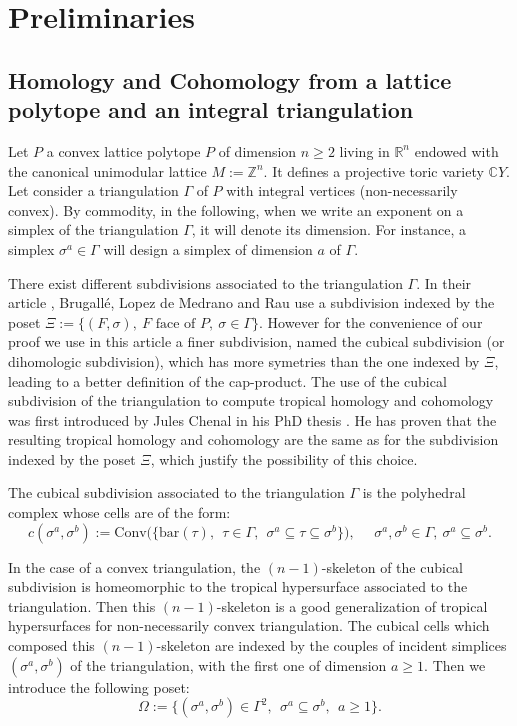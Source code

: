 \documentclass{article}
\begin{document}
\section{Preliminaries}

\subsection{Homology and Cohomology from a lattice polytope and an integral triangulation}

Let $P$ a convex lattice polytope $P$ of dimension $n \geq 2$ living in $\mathbb{R}^n$ endowed with the canonical unimodular lattice $M:= \mathbb{Z}^n$. It defines a projective toric variety $\mathbb{C}Y$. Let consider a triangulation $\Gamma$ of $P$ with integral vertices (non-necessarily convex). By commodity, in the following, when we write an exponent on a simplex of the triangulation $\Gamma$, it will denote its dimension. For instance, a simplex $\sigma^a \in \Gamma$ will design a simplex of dimension $a$ of $\Gamma$.

There exist different subdivisions associated to the triangulation $\Gamma$. In their article \cite{BMR 2024}, Brugallé, Lopez de Medrano and Rau use a subdivision indexed by the poset $\Xi:=\{(F,\sigma),~F \text{ face of}$ $P,~\sigma \in \Gamma \}$. However for the convenience of our proof we use in this article a finer subdivision, named the cubical subdivision (or dihomologic subdivision), which has more symetries than the one indexed by $\Xi$, leading to a better definition of the cap-product. The use of the cubical subdivision of the triangulation to compute tropical homology and cohomology was first introduced by Jules Chenal in his PhD thesis \cite{Ch 2024}. He has proven that the resulting tropical homology and cohomology are the same as for the subdivision indexed by the poset $\Xi$, which justify the possibility of this choice.

The cubical subdivision associated to the triangulation $\Gamma$ is the polyhedral complex whose cells are of the form:
$$c(\sigma^a,\sigma^b):=\mathrm{Conv}\Bigg(\Bigg\{\mathrm{bar}(\tau),~~\tau\in\Gamma,~~\sigma^a\subseteq\tau\subseteq\sigma^b\Bigg\}\Bigg),~~~~~~\sigma^a,\sigma^b\in\Gamma,~\sigma^a\subseteq\sigma^b.$$

In the case of a convex triangulation, the $(n-1)$-skeleton of the cubical subdivision is homeomorphic to the tropical hypersurface associated to the triangulation. Then this $(n-1)$-skeleton is a good generalization of tropical hypersurfaces for non-necessarily convex triangulation. The cubical cells which composed this $(n-1)$-skeleton are indexed by the couples of incident simplices $(\sigma^a,\sigma^b)$ of the triangulation, with the first one of dimension $a\geq1$. Then we introduce the following poset:
\begin{equation*}
    \Omega:=\{(\sigma^a,\sigma^b)\in\Gamma^2,~~\sigma^a\subseteq\sigma^b, ~~a\geq1\}.
\end{equation*}
\end{document}
